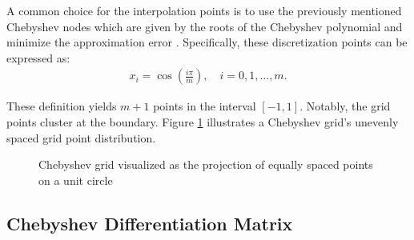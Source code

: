 A common choice for the interpolation points is to use the previously mentioned
Chebyshev nodes which are given by the roots of the Chebyshev polynomial and
minimize the approximation error \citep{boyd2001}. Specifically, these
discretization points can be expressed as:
\begin{align}
x_i = \cos(\frac{i \pi}{m}), \quad i=0, 1,\dots,m.
\label{eq:cheb_nodes1d}
\end{align}

These definition yields $m+1$ points in the interval $[-1, 1]$. Notably, the
grid points cluster at the boundary. Figure \ref{fig:cheb_grid1d} illustrates a
Chebyshev grid's unevenly spaced grid point distribution.

\begin{figure}[ht]
  \centering


  \caption{Chebyshev grid visualized as the projection of equally spaced
    points on a unit circle}
  \label{fig:cheb_grid1d}
\end{figure}

\subsection{Chebyshev Differentiation Matrix}

